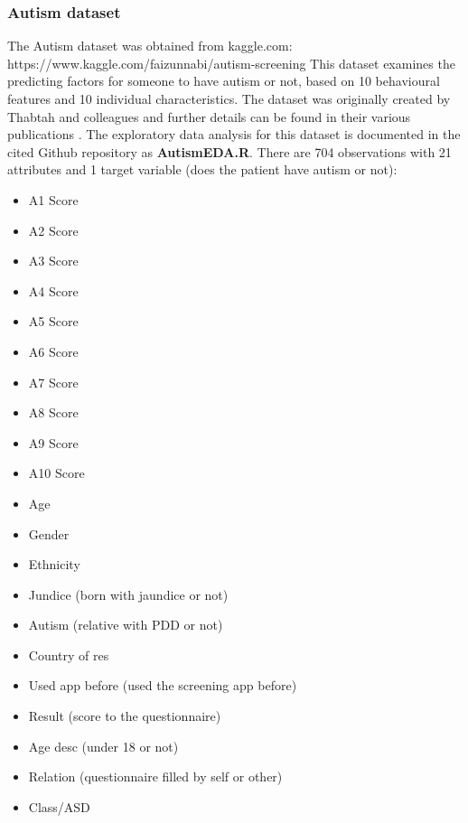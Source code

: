 \subsubsection{Autism dataset}
The Autism dataset was obtained from kaggle.com:\newline
https://www.kaggle.com/faizunnabi/autism-screening\newline
This dataset examines the predicting factors for someone to have autism or not, based on 10 behavioural features and 10 individual characteristics. The dataset was originally created by Thabtah and colleagues and further details can be found in their various publications \citep{Thabtah:2018ck}.\newline
The exploratory data analysis for this dataset is documented in the cited Github repository as \textbf{AutismEDA.R}.
There are 704 observations with 21 attributes and 1 target variable (does the patient have autism or not):\newline
\begin{itemize}
    \item A1 Score 
    \item A2 Score
    \item A3 Score 
    \item A4 Score
    \item A5 Score
    \item A6 Score
    \item A7 Score
    \item A8 Score
    \item A9 Score
    \item A10 Score
    \item Age
    \item Gender
    \item Ethnicity 
    \item Jundice (born with jaundice or not)
    \item Autism (relative with PDD or not)
    \item Country of res
    \item Used app before (used the screening app before)
    \item Result (score to the questionnaire)
    \item Age desc (under 18 or not)
    \item Relation (questionnaire filled by self or other)
    \item Class/ASD
\end{itemize}

